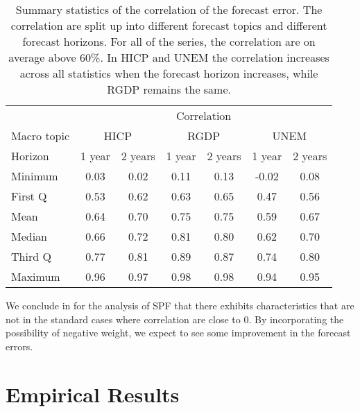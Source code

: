 \documentclass[11pt]{article}
\begin{document}
\begin{table}[!h]
\centering
\caption{Summary statistics of the correlation of the forecast error. The correlation are split up into different forecast topics and different forecast horizons. For all of the series, the correlation are on average above 60\%. In HICP and UNEM the correlation increases across all statistics when the forecast horizon increases, while RGDP remains the same.}
\label{tab: correlation summary statistics}
\begin{tabular}{lcccccc}%
\hline
&\multicolumn{6}{c}{Correlation}\\
\cmidrule(lr){2-7}
Macro topic & \multicolumn{2}{c}{HICP} & \multicolumn{2}{c}{RGDP} & \multicolumn{2}{c}{UNEM} \\
\cmidrule(lr){2-3} \cmidrule(lr){4-5}\cmidrule(lr){6-7}
Horizon     & 1 year & 2 years & 1 year & 2 years & 1 year & 2 years \\ 
\hline
Minimum     & 0.03        & 0.02        & 0.11        & 0.13        & -0.02        & 0.08       \\
First Q     & 0.53        & 0.62        & 0.63        & 0.65        & 0.47         & 0.56       \\
Mean        & 0.64        & 0.70        & 0.75        & 0.75        & 0.59         & 0.67       \\
Median      & 0.66        & 0.72        & 0.81        & 0.80        & 0.62         & 0.70       \\
Third Q     & 0.77        & 0.81        & 0.89        & 0.87        & 0.74         & 0.80       \\
Maximum     & 0.96        & 0.97        & 0.98        & 0.98        & 0.94         & 0.95       \\ 
\hline
\end{tabular}
\end{table}



We conclude in for the analysis of SPF that there exhibits
characteristics that are not in the standard cases where correlation are close to 0. By incorporating the
possibility of negative weight, we expect to see some improvement in the
forecast errors.

\section{Empirical Results}\label{empirical-results}
\end{document}
